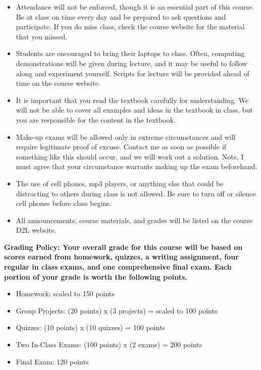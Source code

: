 \documentclass [10pt]{article}
\begin{document}
\begin {itemize}
\setlength{\itemsep}{1pt}
\setlength{\parskip}{0pt}
\setlength{\parsep}{0pt}
\item Attendance will not be enforced, though it is an essential part of this course. Be at class on time every day and be prepared to ask questions and participate. If you do miss class, check the course website for the material that you missed.
\item Students are encouraged to bring their laptops to class. Often, computing demonstrations will be given during lecture, and it may be useful to follow along and experiment yourself. Scripts for lecture will be provided ahead of time on the course website.
\item It is important that you read the textbook carefully for understanding. We will not be able to cover all examples and ideas in the textbook in class, but you are responsible for the content in the textbook. 
\item Make-up exams will be allowed only in extreme circumstances and will require legitimate proof of excuse. Contact me as soon as possible if something like this should occur, and we will work out a solution. Note, I must agree that your circumstance warrants making up the exam beforehand.
\item The use of cell phones, mp3 players, or anything else that could be distracting to others during class is not allowed. Be sure to turn off or silence cell phones before class begins.
\item All announcements, course materials, and grades will be listed on the course D2L website.
\end {itemize}
\pagebreak
\noindent
\bfseries Grading Policy: \normalfont
Your overall grade for this course will be based on scores earned from homework, quizzes, a writing assignment, four regular in class exams, and one comprehensive final exam. Each portion of your grade is worth the following points. \vspace{-3mm} 
\begin {itemize}
\setlength{\itemsep}{1pt}
\setlength{\parskip}{0pt}
\setlength{\parsep}{0pt}
\item Homework: scaled to 150 points
\item Group Projects: (20 points) x (3 projects) =  scaled to 100 points
\item Quizzes: (10 points) x (10 quizzes) = 100 points
\item Two In-Class Exams: (100 points) x (2 exams) = 200 points
\item Final Exam: 120 points
\end {itemize}
\end{document}
